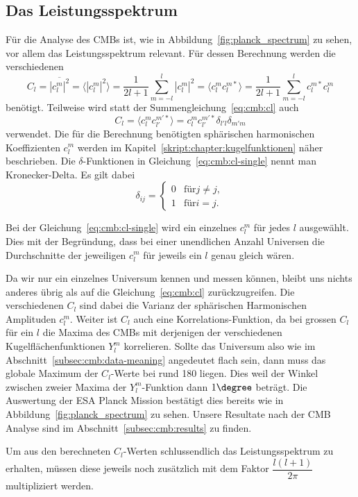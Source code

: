 \subsection{Das Leistungsspektrum\label{subsec:cmb:cl}}

Für die Analyse des CMBs ist, wie in Abbildung~\ref{fig:planck_spectrum} zu 
sehen, vor allem das Leistungsspektrum relevant. Für dessen Berechnung werden 
die verschiedenen
\begin{equation}
	C_l = \overline{|c_l^m|^2} = \langle |c_l^m|^2 \rangle =  \frac{1}{2l + 
	1}\sum_{m=-l}^{l}|c_l^m|^2 = \langle c_l^m 
	c_l^{m*} \rangle = 
	\frac{1}{2l + 
	1}\sum_{m=-l}^{l}c_l^{m*}c_l^m
	\label{eq:cmb:cl}
\end{equation}
benötigt. Teilweise wird statt der Summengleichung~\ref{eq:cmb:cl} auch
\begin{equation*}
	C_l = \langle c_{l}^{m}c_{l'}^{m'*} \rangle = 
	c_{l}^{m}c_{l'}^{m'*}\delta_{l'l}\delta_{m'm}
	\label{eq:cmb:cl-single}
\end{equation*}
verwendet. Die für die Berechnung benötigten sphärischen harmonischen 
Koeffizienten $c_l^m$ werden im Kapitel~\ref{skript:chapter:kugelfunktionen} 
näher beschrieben. Die $\delta$-Funktionen in Gleichung~\ref{eq:cmb:cl-single} 
nennt man Kronecker-Delta. Es gilt dabei
\begin{equation}
\delta_{ij} =
\begin{cases}
0 & \text{für} j \neq j, \\
1 & \text{für} i = j.
\end{cases}
\end{equation}

Bei der Gleichung~\ref{eq:cmb:cl-single} wird ein einzelnes 
$c_l^m$ für jedes $l$ ausgewählt. Dies mit der Begründung, dass bei einer 
unendlichen Anzahl Universen die Durchschnitte der jeweiligen $c_l^m$ für 
jeweils ein $l$ genau gleich wären. \cite{cmb_klauber}

Da wir nur ein einzelnes Universum kennen und messen können, bleibt uns 
nichts anderes übrig als auf die Gleichung~\ref{eq:cmb:cl} zurückzugreifen. Die 
verschiedenen $C_l$ sind dabei die Varianz der sphärischen Harmonischen 
Amplituden $c_l^m$. Weiter ist $C_l$ auch eine Korrelations-Funktion, da bei 
grossen $C_l$ für ein $l$ die Maxima des CMBs mit derjenigen der verschiedenen 
Kugelflächenfunktionen $Y_l^m$ korrelieren. Sollte das Universum also wie im 
Abschnitt~\ref{subsec:cmb:data-meaning} angedeutet flach sein, dann muss das 
globale Maximum der $C_l$-Werte bei rund 180 liegen. Dies weil der Winkel 
zwischen zweier Maxima der $Y_l^m$-Funktion dann $1\degree$ beträgt. Die 
Auswertung der ESA Planck Mission bestätigt dies bereits wie in 
Abbildung~\ref{fig:planck_spectrum} zu sehen. Unsere Resultate nach der CMB 
Analyse sind im Abschnitt~\ref{subsec:cmb:results} zu finden.

Um aus den berechneten $C_l$-Werten schlussendlich das Leistungsspektrum zu 
erhalten, müssen diese jeweils noch zusätzlich mit dem Faktor 
$\dfrac{l(l+1)}{2\pi}$ multipliziert werden.